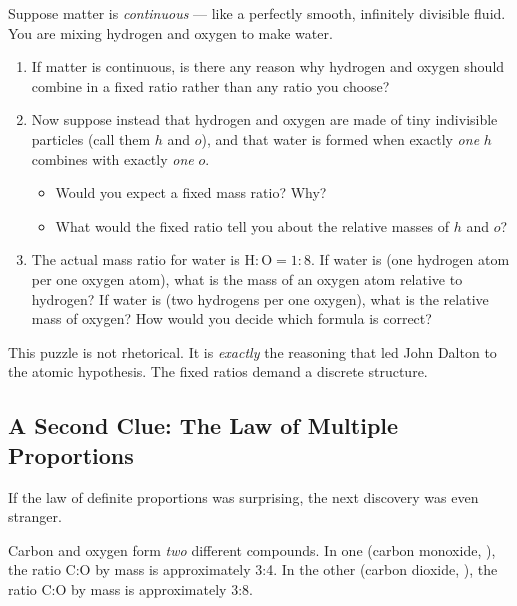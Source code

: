 \documentclass[12pt, a4paper]{book}
\theoremstyle{definition}
\begin{document}
\begin{puzzlebox}
Suppose matter is \emph{continuous} --- like a perfectly
smooth, infinitely divisible fluid.
You are mixing hydrogen and oxygen to make water.

\begin{enumerate}[label=(\alph*), leftmargin=*]
  \item If matter is continuous, is there any reason
        why hydrogen and oxygen should combine in
        a fixed ratio rather than any ratio you choose?

  \item Now suppose instead that hydrogen and oxygen are made
        of tiny indivisible particles (call them $h$ and $o$),
        and that water is formed when exactly \emph{one} $h$
        combines with exactly \emph{one} $o$.
        \begin{itemize}[nosep]
          \item Would you expect a fixed mass ratio? Why?
          \item What would the fixed ratio tell you about
                the relative masses of $h$ and $o$?
        \end{itemize}

  \item The actual mass ratio for water is $\text{H}:\text{O} = 1:8$.
        If water is  (one hydrogen atom per one oxygen atom),
        what is the mass of an oxygen atom relative to hydrogen?
        If water is  (two hydrogens per one oxygen),
        what is the relative mass of oxygen?
        How would you decide which formula is correct?
\end{enumerate}
\end{puzzlebox}

\vspace{0.5em}

This puzzle is not rhetorical.
It is \emph{exactly} the reasoning that led John Dalton
to the atomic hypothesis.
The fixed ratios demand a discrete structure.

\subsection{A Second Clue: The Law of Multiple Proportions}

If the law of definite proportions was surprising,
the next discovery was even stranger.

Carbon and oxygen form \emph{two} different compounds.
In one (carbon monoxide, ), the ratio C:O by mass is
approximately 3:4.
In the other (carbon dioxide, ), the ratio C:O by mass is
approximately 3:8.
\end{document}
